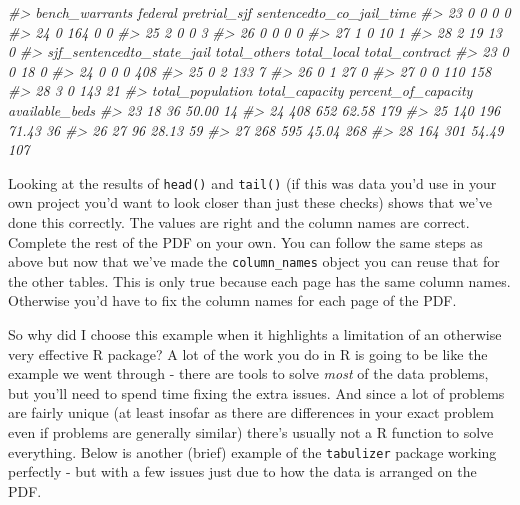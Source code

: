 \documentclass[
  12pt,
]{book}
\newenvironment{Shaded}{\begin{snugshade}}{\end{snugshade}}
\newcommand{\CommentTok}[1]{\textcolor[rgb]{0.37,0.37,0.37}{\textit{#1}}}
\begin{document}
\begin{Shaded}
\begin{Highlighting}[]
\CommentTok{\#>    bench\_warrants federal pretrial\_sjf sentencedto\_co\_jail\_time}
\CommentTok{\#> 23              0       0            0                        0}
\CommentTok{\#> 24              0     164            0                        0}
\CommentTok{\#> 25              2       0            0                        3}
\CommentTok{\#> 26              0       0            0                        0}
\CommentTok{\#> 27              1       0           10                        1}
\CommentTok{\#> 28              2      19           13                        0}
\CommentTok{\#>    sjf\_sentencedto\_state\_jail total\_others total\_local total\_contract}
\CommentTok{\#> 23                          0            0          18              0}
\CommentTok{\#> 24                          0            0           0            408}
\CommentTok{\#> 25                          0            2         133              7}
\CommentTok{\#> 26                          0            1          27              0}
\CommentTok{\#> 27                          0            0         110            158}
\CommentTok{\#> 28                          3            0         143             21}
\CommentTok{\#>    total\_population total\_capacity percent\_of\_capacity available\_beds}
\CommentTok{\#> 23               18             36               50.00             14}
\CommentTok{\#> 24              408            652               62.58            179}
\CommentTok{\#> 25              140            196               71.43             36}
\CommentTok{\#> 26               27             96               28.13             59}
\CommentTok{\#> 27              268            595               45.04            268}
\CommentTok{\#> 28              164            301               54.49            107}
\end{Highlighting}
\end{Shaded}

Looking at the results of \texttt{head()} and \texttt{tail()} (if this was data you'd use in your own project you'd want to look closer than just these checks) shows that we've done this correctly. The values are right and the column names are correct. Complete the rest of the PDF on your own. You can follow the same steps as above but now that we've made the \texttt{column\_names} object you can reuse that for the other tables. This is only true because each page has the same column names. Otherwise you'd have to fix the column names for each page of the PDF.

So why did I choose this example when it highlights a limitation of an otherwise very effective R package? A lot of the work you do in R is going to be like the example we went through - there are tools to solve \emph{most} of the data problems, but you'll need to spend time fixing the extra issues. And since a lot of problems are fairly unique (at least insofar as there are differences in your exact problem even if problems are generally similar) there's usually not a R function to solve everything. Below is another (brief) example of the \texttt{tabulizer} package working perfectly - but with a few issues just due to how the data is arranged on the PDF.
\end{document}
